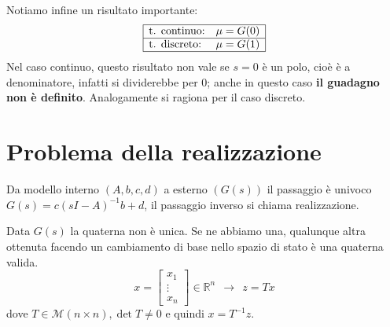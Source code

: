\documentclass[10pt,a4paper]{book}
\begin{document}
Notiamo infine un risultato importante:
\begin{equation*}
	\begin{array}{|l c|}
		\hline
		\text{t. continuo:} & \mu =G(0) \\
		\hline
		\text{t. discreto:} & \mu =G(1) \\
		\hline
	\end{array}
\end{equation*}
Nel caso continuo, questo risultato non vale se $s=0$ è un polo, cioè è a denominatore, infatti si dividerebbe per $0$; anche in questo caso \textbf{il guadagno non è definito}. Analogamente si ragiona per il caso discreto.
\section{Problema della realizzazione}

Da modello interno $(A,b,c,d)$ a esterno $(G(s))$ il passaggio è univoco $G(s) =c(sI-A)^{-1} b+d$, il passaggio inverso si chiama realizzazione.

Data $G(s)$ la quaterna non è unica. Se ne abbiamo una, qualunque altra ottenuta facendo un cambiamento di base nello spazio di stato è una quaterna valida.
\begin{equation*}
	x=\begin{bmatrix}
	x_1\\
	\vdots \\
	x_n
	\end{bmatrix} \in \mathbb{R}^n \ \ \rightarrow \ \ z=Tx
\end{equation*}
dove $T\in \mathcal{M}(n\times n) ,\det T\neq 0$ e quindi $x=T^{-1} z$.
\end{document}
